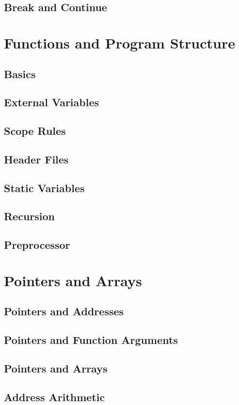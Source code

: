\documentclass{scrartcl}
\begin{document}
        \subsection{Break and Continue}
    \section{Functions and Program Structure}
        \subsection{Basics}
        \subsection{External Variables}
        \subsection{Scope Rules}
        \subsection{Header Files}
        \subsection{Static Variables}
        \subsection{Recursion}
        \subsection{Preprocessor}
    \section{Pointers and Arrays}
        \subsection{Pointers and Addresses}
        \subsection{Pointers and Function Arguments}
        \subsection{Pointers and Arrays}
        \subsection{Address Arithmetic}
\end{document}
